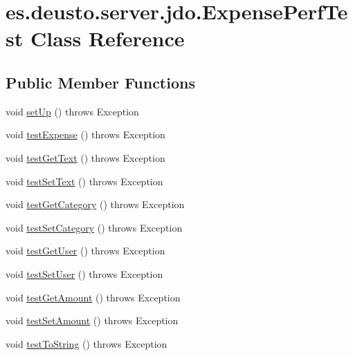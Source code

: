 \hypertarget{classes_1_1deusto_1_1server_1_1jdo_1_1_expense_perf_test}{}\section{es.\+deusto.\+server.\+jdo.\+Expense\+Perf\+Test Class Reference}
\label{classes_1_1deusto_1_1server_1_1jdo_1_1_expense_perf_test}
\subsection*{Public Member Functions}
\begin{DoxyCompactItemize}
\item 
void \hyperlink{classes_1_1deusto_1_1server_1_1jdo_1_1_expense_perf_test_a0e502f9886deb99f4b0ba6b31a546996}{set\+Up} ()  throws Exception 
\item 
void \hyperlink{classes_1_1deusto_1_1server_1_1jdo_1_1_expense_perf_test_ae31bef49b4d03ba25a303945ffadedad}{test\+Expense} ()  throws Exception 
\item 
void \hyperlink{classes_1_1deusto_1_1server_1_1jdo_1_1_expense_perf_test_a655751993f97c058c67931ae1df92fe5}{test\+Get\+Text} ()  throws Exception 
\item 
void \hyperlink{classes_1_1deusto_1_1server_1_1jdo_1_1_expense_perf_test_a17c0cf189f685579b1d74139939956d5}{test\+Set\+Text} ()  throws Exception 
\item 
void \hyperlink{classes_1_1deusto_1_1server_1_1jdo_1_1_expense_perf_test_ae01a7e173ed07a7a15fb1b9a026dab84}{test\+Get\+Category} ()  throws Exception 
\item 
void \hyperlink{classes_1_1deusto_1_1server_1_1jdo_1_1_expense_perf_test_aae4c6f0354a5537b29594b4b6d75818b}{test\+Set\+Category} ()  throws Exception 
\item 
void \hyperlink{classes_1_1deusto_1_1server_1_1jdo_1_1_expense_perf_test_a3de2e2071935d39495c7fc4e1820fe8b}{test\+Get\+User} ()  throws Exception 
\item 
void \hyperlink{classes_1_1deusto_1_1server_1_1jdo_1_1_expense_perf_test_afd633402806a32f1792407b620aac675}{test\+Set\+User} ()  throws Exception 
\item 
void \hyperlink{classes_1_1deusto_1_1server_1_1jdo_1_1_expense_perf_test_ad3a01da45d045f9ea58673eb6aecbc7b}{test\+Get\+Amount} ()  throws Exception 
\item 
void \hyperlink{classes_1_1deusto_1_1server_1_1jdo_1_1_expense_perf_test_abf38be98f3435425dd0b97940d933e5f}{test\+Set\+Amount} ()  throws Exception 
\item 
void \hyperlink{classes_1_1deusto_1_1server_1_1jdo_1_1_expense_perf_test_aceacce2fc2defc16179d2aa2cde8f9df}{test\+To\+String} ()  throws Exception
\end{DoxyCompactItemize}

